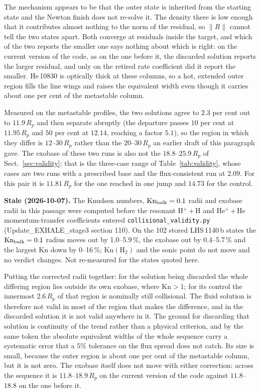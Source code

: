 \documentclass[english,a4paper]{my_memo}
\begin{document}
\medskip
\noindent The mechanism appears to be that the outer state is inherited from
the starting state and the Newton finish does not re-solve it. The density
there is low enough that it contributes almost nothing to the norm of the
residual, so $\|R\|$ cannot tell the two states apart. Both converge at
residuals inside the target, and which of the two reports the smaller one
says nothing about which is right: on the current version of the code, as on
the one before it, the discarded solution reports the larger residual, and
only on the retired rate coefficient did it report the smaller. He\,10830 is
optically thick at these columns, so a hot, extended outer region fills the
line wings and raises the equivalent width even though it carries about one
per cent of the metastable column.

\medskip
\noindent Measured on the metastable profiles, the two solutions agree to
$2.3$ per cent out to $11.9\,R_p$ and then separate abruptly (the departure
passes $10$ per cent at $11.95\,R_p$ and $50$ per cent at $12.14$, reaching a
factor $5.1$), so the region in which they differ is $12$--$30\,R_p$ rather
than the $20$--$30\,R_p$ an earlier draft of this paragraph gave. The exobase
of these two runs is also not the $18.8$--$25.9\,R_p$ of
Sect.~\ref{sec:validity}: that is the three-case range of
Table~\ref{tab:validity}, whose cases are two runs with a prescribed base and
the flux-consistent run at $2.09$. For this pair it is $11.81\,R_p$ for the
one reached in one jump and $14.73$ for the control.

\noindent\textbf{Stale (2026-10-07).} The Knudsen numbers, $\mathrm{Kn}_{\rm bulk}=0.1$ radii and exobase radii in this passage were computed before the resonant H$^+$\,+\,H and He$^+$\,+\,He momentum-transfer coefficients entered \texttt{collisional\_validity.py} (Update\_EXHALE\_stage3 section 110). On the 102 stored LHS\,1140\,b states the $\mathrm{Kn}_{\rm bulk}=0.1$ radius moves out by 1.0--5.9\,\%, the exobase out by 0.4--5.7\,\% and the largest Kn down by 0--16\,\%; $\mathrm{Kn}(\mathrm{H_2})$ and the sonic point do not move and no verdict changes. Not re-measured for the states quoted here.

Putting the corrected radii together: for the solution being discarded the
whole differing region lies outside its own exobase, where $\mathrm{Kn} > 1$;
for its control the innermost $2.6\,R_p$ of that region is nominally still
collisional. The fluid solution is therefore not valid in most of the region
that makes the difference, and in the discarded solution it is not valid
anywhere in it. The ground for discarding that solution is continuity of the
trend rather than a physical criterion, and by the same token the absolute
equivalent widths of the whole sequence carry a systematic error that a $5\%$
tolerance on the flux spread does not catch. Its size is small, because the
outer region is about one per cent of the metastable column, but it is not
zero. The exobase itself does not move with either correction: across the
sequence it is $11.8$--$18.9\,R_p$ on the current version of the code against
$11.8$--$18.8$ on the one before it.
\end{document}
